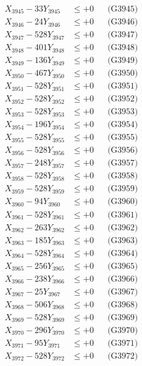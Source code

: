 \documentclass[a4paper,10pt]{article}
\begin{document}
{\begin{align}
X_{3945} - 33Y_{3945} &\leq +0 && \text{(G3945)} \\
X_{3946} - 24Y_{3946} &\leq +0 && \text{(G3946)} \\
X_{3947} - 528Y_{3947} &\leq +0 && \text{(G3947)} \\
X_{3948} - 401Y_{3948} &\leq +0 && \text{(G3948)} \\
X_{3949} - 136Y_{3949} &\leq +0 && \text{(G3949)} \\
X_{3950} - 467Y_{3950} &\leq +0 && \text{(G3950)} \\
\allowbreak
X_{3951} - 528Y_{3951} &\leq +0 && \text{(G3951)} \\
X_{3952} - 528Y_{3952} &\leq +0 && \text{(G3952)} \\
X_{3953} - 528Y_{3953} &\leq +0 && \text{(G3953)} \\
X_{3954} - 196Y_{3954} &\leq +0 && \text{(G3954)} \\
X_{3955} - 528Y_{3955} &\leq +0 && \text{(G3955)} \\
X_{3956} - 528Y_{3956} &\leq +0 && \text{(G3956)} \\
X_{3957} - 248Y_{3957} &\leq +0 && \text{(G3957)} \\
X_{3958} - 528Y_{3958} &\leq +0 && \text{(G3958)} \\
X_{3959} - 528Y_{3959} &\leq +0 && \text{(G3959)} \\
X_{3960} - 94Y_{3960} &\leq +0 && \text{(G3960)} \\
\allowbreak
X_{3961} - 528Y_{3961} &\leq +0 && \text{(G3961)} \\
X_{3962} - 263Y_{3962} &\leq +0 && \text{(G3962)} \\
X_{3963} - 185Y_{3963} &\leq +0 && \text{(G3963)} \\
X_{3964} - 528Y_{3964} &\leq +0 && \text{(G3964)} \\
X_{3965} - 256Y_{3965} &\leq +0 && \text{(G3965)} \\
X_{3966} - 238Y_{3966} &\leq +0 && \text{(G3966)} \\
X_{3967} - 25Y_{3967} &\leq +0 && \text{(G3967)} \\
X_{3968} - 506Y_{3968} &\leq +0 && \text{(G3968)} \\
X_{3969} - 528Y_{3969} &\leq +0 && \text{(G3969)} \\
X_{3970} - 296Y_{3970} &\leq +0 && \text{(G3970)} \\
\allowbreak
X_{3971} - 95Y_{3971} &\leq +0 && \text{(G3971)} \\
X_{3972} - 528Y_{3972} &\leq +0 && \text{(G3972)} \\

\end{align}}
\end{document}
